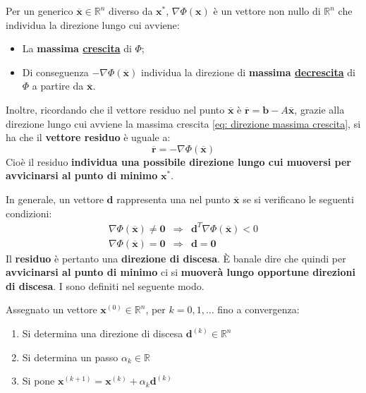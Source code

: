 \highspace
Per un generico $\overline{\mathbf{x}} \in \mathbb{R}^{n}$ diverso da $\mathbf{x}^{*}$, $\nabla\varPhi\left(\mathbf{x}\right)$ è un vettore non nullo di $\mathbb{R}^{n}$ che individua la direzione lungo cui avviene:
\begin{itemize}
    \item La \textbf{massima \underline{crescita}} di $\varPhi$;
    \item Di conseguenza $-\nabla\varPhi\left(\overline{\mathbf{x}}\right)$ individua la direzione di \textbf{massima \underline{decrescita}} di $\varPhi$ a partire da $\overline{\mathbf{x}}$.
\end{itemize}
Inoltre, ricordando che il vettore residuo nel punto $\overline{\mathbf{x}}$ è $\overline{\mathbf{r}} = \mathbf{b} - A\overline{\mathbf{x}}$, grazie alla direzione lungo cui avviene la massima crescita \ref{eq: direzione massima crescita}, si ha che il \textbf{vettore residuo} è uguale a:
\begin{equation}
    \overline{\mathbf{r}} = -\nabla\varPhi\left(\overline{\mathbf{x}}\right)
\end{equation}
Cioè il residuo \textbf{individua una possibile direzione lungo cui muoversi per avvicinarsi al punto di minimo} $\mathbf{x}^{*}$.

\highspace
In generale, un vettore $\mathbf{d}$ rappresenta una  nel punto $\overline{\mathbf{x}}$ se si verificano le seguenti condizioni:
\begin{equation}
    \begin{array}{rcl}
        \nabla\varPhi\left(\overline{\mathbf{x}}\right) \ne \mathbf{0} &\Rightarrow& \mathbf{d}^{T}\nabla\varPhi\left(\overline{\mathbf{x}}\right) < 0 \\ [.5em]
        \nabla\varPhi\left(\overline{\mathbf{x}}\right) = \mathbf{0} &\Rightarrow& \mathbf{d} = \mathbf{0}
    \end{array}
\end{equation}
Il \textbf{residuo} è pertanto una \textbf{direzione di discesa}. È banale dire che quindi per \textbf{avvicinarsi al punto di minimo} ci si \textbf{muoverà lungo opportune direzioni di discesa}. I  sono definiti nel seguente modo.

\begin{definitionbox}
    Assegnato un vettore $\mathbf{x}^{\left(0\right)} \in \mathbb{R}^{n}$, per $k = 0, 1, \dots$ fino a convergenza:
    \begin{enumerate}
        \item Si determina una direzione di discesa $\mathbf{d}^{\left(k\right)} \in \mathbb{R}^{n}$
        \item Si determina un passo $\alpha_{k} \in \mathbb{R}$
        \item Si pone $\mathbf{x}^{\left(k+1\right)} = \mathbf{x}^{\left(k\right)} + \alpha_{k}\mathbf{d}^{\left(k\right)}$
    \end{enumerate}
\end{definitionbox}

